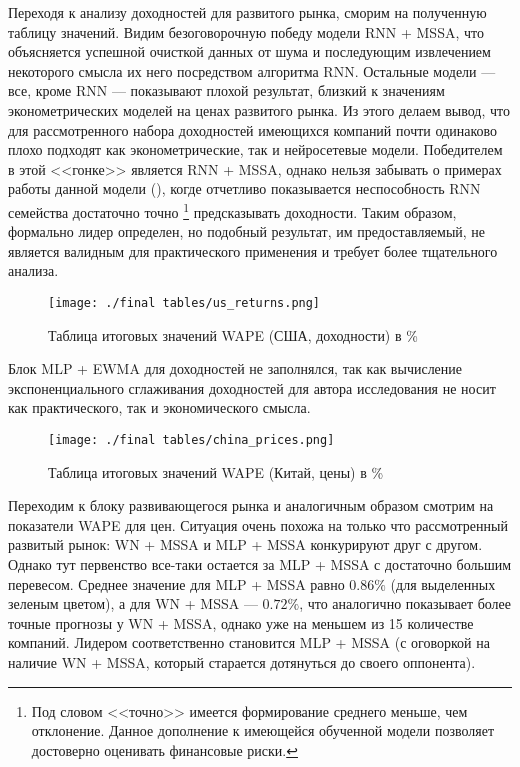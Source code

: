 Переходя к анализу доходностей для развитого рынка, сморим на полученную таблицу значений. Видим безоговорочную победу модели RNN + MSSA, что объясняется успешной очисткой данных от шума и последующим извлечением некоторого смысла их него посредством алгоритма RNN. Остальные модели --- все, кроме RNN --- показывают плохой результат, близкий к значениям эконометрических моделей на ценах развитого рынка. Из этого делаем вывод, что для рассмотренного набора доходностей имеющихся компаний почти одинаково плохо подходят как эконометрические, так и нейросетевые модели. Победителем в этой <<гонке>> является RNN + MSSA, однако нельзя забывать о примерах работы данной модели (), когде отчетливо показывается неспособность RNN семейства достаточно точно \footnote{Под словом <<точно>> имеется формирование среднего меньше, чем отклонение. Данное дополнение к имеющейся обученной модели позволяет достоверно оценивать финансовые риски.} предсказывать доходности. Таким образом, формально лидер определен, но подобный результат, им предоставляемый, не является валидным для практического применения и требует более тщательного анализа.
\begin{figure}[H]
	\centering
	\texttt{[image: ./final tables/us\_returns.png]}
	\caption{Таблица итоговых значений WAPE (США, доходности) в \%}
	\label{pic::final_table_us_returns}
\end{figure}

\noindent Блок MLP + EWMA для доходностей не заполнялся, так как вычисление экспоненциального сглаживания доходностей для автора исследования не носит как практического, так и экономического смысла.

\begin{figure}[H]
	\centering
	\texttt{[image: ./final tables/china\_prices.png]}
	\caption{Таблица итоговых значений WAPE (Китай, цены) в \%}
	\label{pic::final_table_china_prices}
\end{figure}


Переходим к блоку развивающегося рынка и аналогичным образом смотрим на показатели WAPE для цен. Ситуация очень похожа на только что рассмотренный развитый рынок: WN + MSSA и MLP + MSSA конкурируют друг с другом. Однако тут первенство все-таки остается за MLP + MSSA с достаточно большим перевесом. Среднее значение для MLP + MSSA равно $0.86\%$ (для выделенных зеленым цветом), а для WN + MSSA --- $0.72\%$, что аналогично показывает более точные прогнозы у WN + MSSA, однако уже на меньшем из 15 количестве компаний. Лидером соответственно становится MLP + MSSA (с оговоркой на наличие WN + MSSA, который старается дотянуться до своего оппонента).

